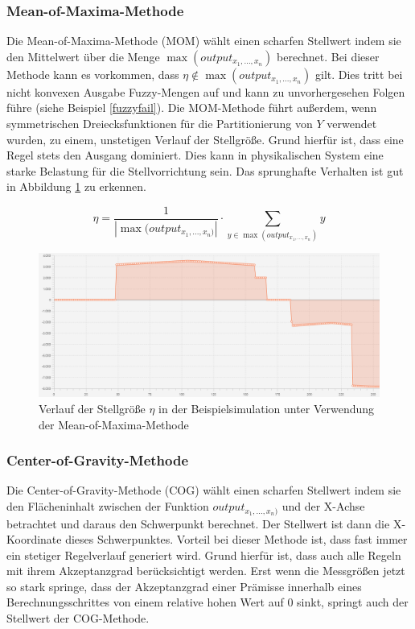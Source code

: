 \documentclass[12pt,a4paper,bibliography=totocnumbered,listof=totocnumbered, abstracton]{scrartcl}
\theoremstyle{Umgebung}
\begin{document}
\subsubsection{Mean-of-Maxima-Methode}

Die Mean-of-Maxima-Methode (MOM) wählt einen scharfen Stellwert indem sie den Mittelwert über die Menge $\max(output_{x_1,..., x_n})$ berechnet. Bei dieser Methode kann es vorkommen, dass $\eta \notin  \max(output_{x_1,..., x_n})$ gilt. Dies tritt bei nicht konvexen Ausgabe Fuzzy-Mengen auf und kann zu unvorhergesehen Folgen führe (siehe Beispiel \ref{fuzzyfail}). Die MOM-Methode führt außerdem, wenn symmetrischen Dreiecksfunktionen für die Partitionierung von $Y$ verwendet wurden, zu einem, unstetigen Verlauf der Stellgröße. Grund hierfür ist, dass eine Regel stets den Ausgang dominiert. Dies kann in physikalischen System eine starke Belastung für die Stellvorrichtung sein. Das sprunghafte Verhalten ist gut in Abbildung \ref{fig:mom} zu erkennen. 
 

\begin{equation}
\eta = \frac{1}{ | \max(output_{x_1,..., x_n)} | } \cdot \sum_{y\in \max(output_{x_1,..., x_n})} y
\end{equation}

\begin{figure}
	\centering
	\includegraphics[width=0.8\linewidth]{img/defuzzy/mom3}
	\caption{Verlauf der Stellgröße $\eta$ in der Beispielsimulation unter Verwendung der Mean-of-Maxima-Methode}
	\label{fig:mom}
\end{figure}

\subsubsection{Center-of-Gravity-Methode}

Die Center-of-Gravity-Methode (COG) wählt einen scharfen Stellwert indem sie den Flächeninhalt zwischen der Funktion $output_{x_1,..., x_n)}$ und der X-Achse betrachtet und daraus den Schwerpunkt berechnet. Der Stellwert ist dann die X-Koordinate dieses Schwerpunktes. Vorteil bei dieser Methode ist, dass fast immer ein stetiger Regelverlauf generiert wird. Grund hierfür ist, dass auch alle Regeln mit ihrem Akzeptanzgrad berücksichtigt werden. Erst wenn die Messgrößen jetzt so stark springe, dass der Akzeptanzgrad einer Prämisse innerhalb eines Berechnungsschrittes von einem relative hohen Wert auf 0 sinkt, springt auch der Stellwert der COG-Methode.
\end{document}
